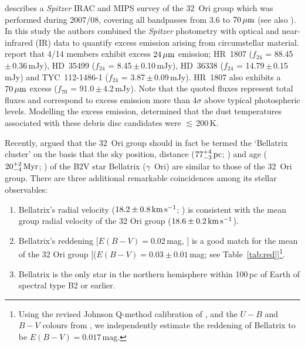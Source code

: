 \documentclass[usenatbib]{mnras}
\begin{document}
\cite{Shvonski16} describes a 
\emph{Spitzer} IRAC and MIPS survey of the 32~Ori group which was
performed during 2007/08, covering all bandpasses from 3.6 to
$70\,\rm{\mu m}$ (see also \citealp{Shvonski10}). In this study the
authors combined the \emph{Spitzer} photometry with optical and near-infrared
(IR) data to quantify excess emission arising from circumstellar
material. \citeauthor{Shvonski16} report that 4/14 members exhibit excess
$24\,\rm{\mu m}$ emission; HR~1807 ($f_{24}$ = 88.45\,$\pm$\,0.36\,mJy),
HD~35499 ($f_{24}$ = 8.45\,$\pm$\,0.10\,mJy), HD~36338 ($f_{24}$ =
14.79\,$\pm$\,0.15\,mJy) and TYC~112-1486-1 ($f_{24}$ =
3.87\,$\pm$\,0.09\,mJy). HR~1807 also exhibits a $70\,\rm{\mu m}$
excess ($f_{70}$ = 91.0\,$\pm$\,4.2\,mJy). 
Note that the quoted fluxes represent total fluxes
and correspond to excess emission more than 4$\sigma$ above typical
photospheric levels. Modelling the excess
emission, \citeauthor{Shvonski16} determined that the dust
temperatures associated with these debris disc candidates were $\lesssim$\,200\,K.

Recently, \cite{Bouy15} argued that the 32~Ori group should in fact be
termed the `Bellatrix cluster' on the basis that the sky position,
distance ($77^{+4}_{-3}\,\rm{pc}$; \citealp{vanLeeuwen07}) and age
($20^{+2}_{-4}\,\rm{Myr}$; \citealp{Janson11}) of the B2V star
Bellatrix ($\gamma$~Ori) are similar to those of the 32~Ori group.
There are three additional remarkable coincidences among its stellar
observables:
%
\begin{enumerate}
%
\item Bellatrix's radial velocity
  ($18.2\pm0.8\,\rm{km\,s^{-1}}$; \citealp{Barbier-Brossat00}) is
  consistent with the mean group radial velocity of the 32 Ori group
  ($18.6\pm0.2\,\rm{km\,s^{-1}}$).
%
\item Bellatrix's reddening [$E(B-V)=0.02$\,mag,
    \citealp{Friedemann92,Zorec09,Bhatt15}] is a good match for the
  mean of the 32 Ori group [($E(B-V)=0.03\pm0.01$\,mag; see
    Table~\ref{tab:red}]\footnote{Using the revised Johnson Q-method
    calibration of \citet{Pecaut13}, and the $U-B$ and $B-V$ colours
    from \citet{Mermilliod06}, we independently estimate the reddening
    of Bellatrix to be $E(B-V)=0.017$\,mag.}.
%
\item Bellatrix is the only star in
  the northern hemisphere within 100\,pc of Earth of spectral type B2 or earlier.
\end{enumerate}
\end{document}
